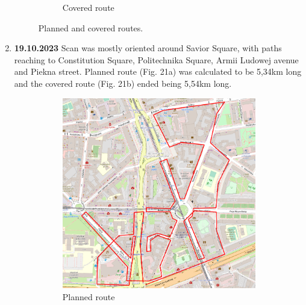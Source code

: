 \documentclass[a4paper,12pt]{article}
\begin{document}
\begin{enumerate}
\begin{figure}[H]
\begin{subfigure}{.95\textwidth}
			\caption{Covered route}
			\label{fig:b19}
		\end{subfigure}
		\caption{Planned and covered routes.}
		\label{fig:fig19}
	\end{figure} 
	\pagebreak
	\item \textbf{19.10.2023} Scan was mostly oriented around Savior Square, with paths reaching to Constitution Square, Politechnika Square, Armii Ludowej avenue and Piekna street. Planned route (Fig. 21a) was calculated to be 5,34km long and the covered route (Fig. 21b) ended being 5,54km long.
	\begin{figure}[H]
		\centering
		\begin{subfigure}{.69\textwidth}
			\centering
			\includegraphics[width=1\linewidth]{route_p20}
			\caption{Planned route}
			\label{fig:a20}
		\end{subfigure}%
		\linebreak
		\begin{subfigure}{.69\textwidth}
			\centering

\end{subfigure}
\end{figure}
\end{enumerate}
\end{document}
